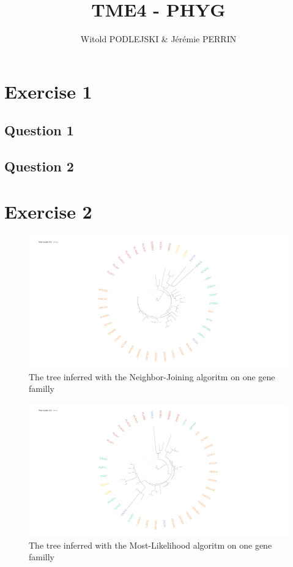 \documentclass[]{article}
\title{TME4 - PHYG}
\author{Witold PODLEJSKI \& Jérémie PERRIN}
\theoremstyle{definition}
\begin{document}
\maketitle

\section{Exercise 1}
\subsection{Question 1}
\subsection{Question 2}
\section{Exercise 2}

\begin{figure}[H]
	\includegraphics*[width = \linewidth]{image/Nj_ex2.pdf}
	\caption{ The tree inferred with the Neighbor-Joining algoritm on one gene familly }
\end{figure}

\begin{figure}[H]
	\includegraphics*[width = \linewidth]{image/Ml_ex2.pdf}
	\caption{ The tree inferred with the Most-Likelihood algoritm on one gene familly}
\end{figure}
\end{document}
